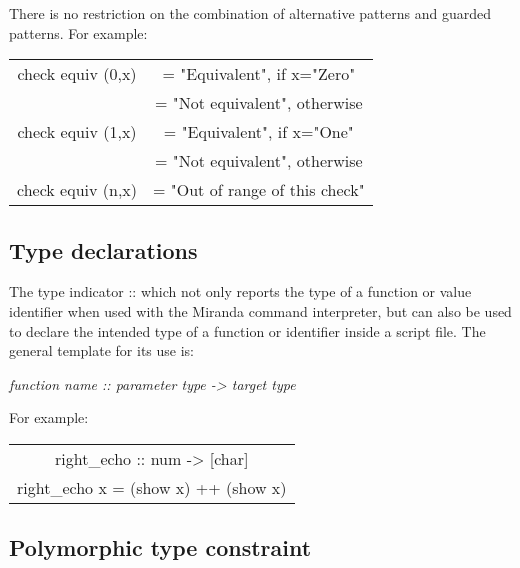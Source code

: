 \documentclass[11pt]{article}
\begin{document}
There is no restriction on the combination of alternative patterns and guarded
patterns. For example:


\begin{center}
      
    \begin{tabular}{|c c|}
    \hline
    

  
    check equiv (0,x) &= "Equivalent", if x="Zero" \\
&= "Not equivalent", otherwise\\
check equiv (1,x) &= "Equivalent", if x="One"\\
&= "Not equivalent", otherwise\\
check equiv (n,x) &= "Out of range of this check"\\

\hline
    
    \end{tabular}
\end{center}


\subsection{Type declarations}

The type indicator :: which not only reports the type of
a function or value identifier when used with the Miranda command interpreter,
but can also be used to declare the intended type of a function or identifier inside
a script file. The general template for its use is:\\

\begin{center}
\textit{function name :: parameter type -> target type} \\
\end{center}
For example:

\begin{center}
\begin{tabular}{|c|}

\hline
right\_echo :: num -> [char] \\
right\_echo x = (show x) ++ (show x) \\
\hline

\end{tabular}
\end{center}

\subsection{Polymorphic type constraint}
\end{document}
